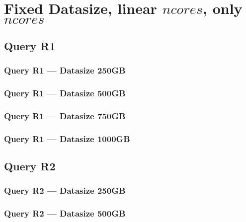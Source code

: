 \newpage
\section{Fixed Datasize, linear $ncores$, only $ncores$}
\subsection{Query R1}
\subsubsection{Query R1 --- Datasize 250GB}



\newpage
\subsubsection{Query R1 --- Datasize 500GB}



\newpage
\subsubsection{Query R1 --- Datasize 750GB}



\newpage
\subsubsection{Query R1 --- Datasize 1000GB}



\newpage
\subsection{Query R2}
\subsubsection{Query R2 --- Datasize 250GB}



\newpage
\subsubsection{Query R2 --- Datasize 500GB}



